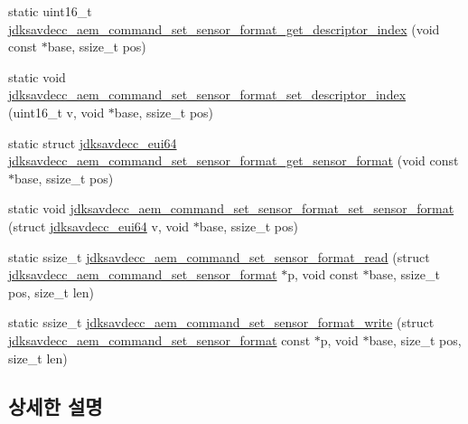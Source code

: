 \begin{DoxyCompactItemize}
\item 
static uint16\+\_\+t \hyperlink{group__command__set__sensor__format_ga11bea3bd4375eb7c11af1e36ba7651d1}{jdksavdecc\+\_\+aem\+\_\+command\+\_\+set\+\_\+sensor\+\_\+format\+\_\+get\+\_\+descriptor\+\_\+index} (void const $\ast$base, ssize\+\_\+t pos)
\item 
static void \hyperlink{group__command__set__sensor__format_gaa742b12490b0465ba9206c11d535de8f}{jdksavdecc\+\_\+aem\+\_\+command\+\_\+set\+\_\+sensor\+\_\+format\+\_\+set\+\_\+descriptor\+\_\+index} (uint16\+\_\+t v, void $\ast$base, ssize\+\_\+t pos)
\item 
static struct \hyperlink{structjdksavdecc__eui64}{jdksavdecc\+\_\+eui64} \hyperlink{group__command__set__sensor__format_ga96e993e53c6112c8bd9a01ceab5f7e2e}{jdksavdecc\+\_\+aem\+\_\+command\+\_\+set\+\_\+sensor\+\_\+format\+\_\+get\+\_\+sensor\+\_\+format} (void const $\ast$base, ssize\+\_\+t pos)
\item 
static void \hyperlink{group__command__set__sensor__format_gabef57fface72cb966b0e933e350333a3}{jdksavdecc\+\_\+aem\+\_\+command\+\_\+set\+\_\+sensor\+\_\+format\+\_\+set\+\_\+sensor\+\_\+format} (struct \hyperlink{structjdksavdecc__eui64}{jdksavdecc\+\_\+eui64} v, void $\ast$base, ssize\+\_\+t pos)
\item 
static ssize\+\_\+t \hyperlink{group__command__set__sensor__format_ga74fa93ebc52647a2215b592fced97379}{jdksavdecc\+\_\+aem\+\_\+command\+\_\+set\+\_\+sensor\+\_\+format\+\_\+read} (struct \hyperlink{structjdksavdecc__aem__command__set__sensor__format}{jdksavdecc\+\_\+aem\+\_\+command\+\_\+set\+\_\+sensor\+\_\+format} $\ast$p, void const $\ast$base, ssize\+\_\+t pos, size\+\_\+t len)
\item 
static ssize\+\_\+t \hyperlink{group__command__set__sensor__format_gaab3946b0df7d2f0eba20d0ac52003220}{jdksavdecc\+\_\+aem\+\_\+command\+\_\+set\+\_\+sensor\+\_\+format\+\_\+write} (struct \hyperlink{structjdksavdecc__aem__command__set__sensor__format}{jdksavdecc\+\_\+aem\+\_\+command\+\_\+set\+\_\+sensor\+\_\+format} const $\ast$p, void $\ast$base, size\+\_\+t pos, size\+\_\+t len)
\end{DoxyCompactItemize}


\subsection{상세한 설명}


